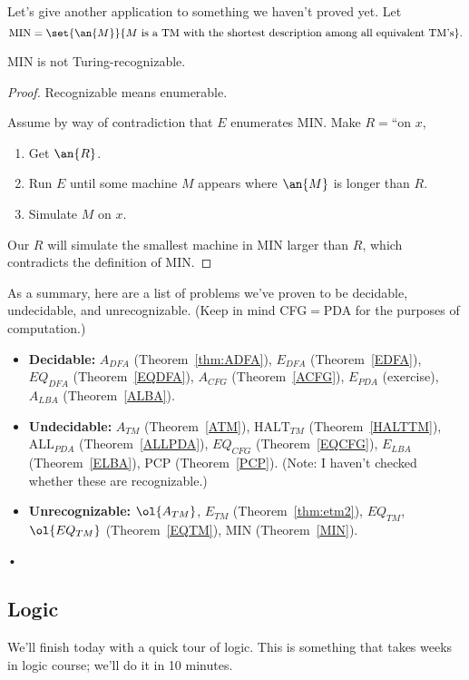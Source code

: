 Let's give another application to something we haven't proved yet.
Let 
\[
\text{MIN}=\set{\an{M}}{M\text{ is a TM with the shortest description among all equivalent TM's}}.
\]
\begin{thm}
MIN is not Turing-recognizable. %
\end{thm}
\begin{proof}
Recognizable means enumerable. 

Assume by way of contradiction that $E$ enumerates MIN. Make $R=$``on $x$,
\begin{enumerate}
\item
Get $\an{R}$.
\item
Run $E$ until some machine $M$ appears where $\an{M}$ is longer than $R$. %
\item Simulate $M$ on $x$.
\end{enumerate}
Our $R$ will simulate the smallest machine in MIN larger than $R$, which contradicts the definition of MIN.
\end{proof}
As a summary, here are a list of problems we've proven to be decidable, undecidable, and unrecognizable. (Keep in mind CFG$=$PDA for the purposes of computation.)
\begin{itemize}
\item \textbf{Decidable:} $A_{DFA}$ (Theorem~\ref{thm:ADFA}), $E_{DFA}$ (Theorem~\ref{EDFA}), $EQ_{DFA}$ (Theorem~\ref{EQDFA}), $A_{CFG}$ (Theorem~\ref{ACFG}),  $E_{PDA}$ (exercise), $A_{LBA}$ (Theorem~\ref{ALBA}).
\item \textbf{Undecidable:} $A_{TM}$ (Theorem~\ref{ATM}), $\text{HALT}_{TM}$ (Theorem~\ref{HALTTM}), $\text{ALL}_{PDA}$ (Theorem~\ref{ALLPDA}), $EQ_{CFG}$ (Theorem~\ref{EQCFG}), $E_{LBA}$ (Theorem~\ref{ELBA}), PCP (Theorem~\ref{PCP}). (Note: I haven't checked whether these are recognizable.)
\item \textbf{Unrecognizable:} $\ol{A_{TM}}$, $E_{TM}$ (Theorem~\ref{thm:etm2}), $EQ_{TM}$, $\ol{EQ_{TM}}$ (Theorem~\ref{EQTM}), MIN (Theorem~\ref{MIN}).
\end{itemize}•
\subsection{Logic}
We'll finish today with a quick tour of logic. This is something that takes weeks in logic course; we'll do it in 10 minutes.

